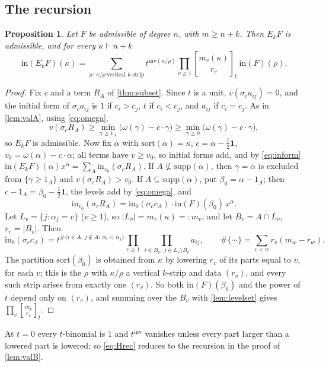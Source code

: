 \documentclass[11pt]{amsart}
\newtheorem{proposition}[theorem]{Proposition}
\theoremstyle{definition}
\theoremstyle{remark}
\numberwithin{equation}{section}
\newcommand{\qbin}[2]{\genfrac{[}{]}{0pt}{}{#1}{#2}_t}
\begin{document}
\subsection{The recursion}
\begin{proposition}\label{prop:Hrec}
Let $F$ be admissible of degree $n$, with $m\ge n+k$. Then $E_kF$ is admissible, and for every $\kappa\vdash n+k$
\begin{equation}\label{eq:Hrec}
\mathrm{in}(E_kF)(\kappa)=\sum_{\rho:\ \kappa/\rho\ \text{vertical $k$-strip}}t^{\mathrm{inv}(\kappa/\rho)}\prod_{v\ge1}\qbin{m_v(\kappa)}{r_v}\ \mathrm{in}(F)(\rho).
\end{equation}
\end{proposition}
\begin{proof}
Fix $c$ and a term $R_A$ of \cref{thm:subset}. Since $t$ is a unit, $v(\sigma_ca_{ij})=0$, and the initial form of $\sigma_ca_{ij}$ is $1$ if $c_i>c_j$, $t$ if $c_i<c_j$, and $a_{ij}$ if $c_i=c_j$. As in \cref{lem:valA}, using \eqref{eq:omega},
\[ v(\sigma_cR_A)\ge\min_{\gamma\ge1_A}\bigl(\omega(\gamma)-c\cdot\gamma\bigr)\ge\min_{\gamma\ge0}\bigl(\omega(\gamma)-c\cdot\gamma\bigr), \]
so $E_kF$ is admissible. Now fix $\alpha$ with $\mathrm{sort}(\alpha)=\kappa$, $c=\alpha-\frac12\mathbf1$, $v_0=\omega(\alpha)-c\cdot\alpha$; all terms have $v\ge v_0$, so initial forms add, and by \eqref{eq:inform} $\mathrm{in}(E_kF)(\alpha)x^\alpha=\sum_A\mathrm{in}_{v_0}(\sigma_cR_A)$. If $A\not\subseteq\mathrm{supp}(\alpha)$, then $\gamma=\alpha$ is excluded from $\{\gamma\ge1_A\}$ and $v(\sigma_cR_A)>v_0$. If $A\subseteq\mathrm{supp}(\alpha)$, put $\beta_0=\alpha-1_A$; then $c-1_A=\beta_0-\frac12\mathbf1$, the levels add by \eqref{eq:omega}, and
\[ \mathrm{in}_{v_0}(\sigma_cR_A)=\mathrm{in}_0(\sigma_cc_A)\cdot\mathrm{in}(F)(\beta_0)\,x^\alpha . \]
Let $L_v=\{j:\alpha_j=v\}$ ($v\ge1$), so $|L_v|=m_v(\kappa)=:m_v$, and let $B_v=A\cap L_v$, $r_v=|B_v|$. Then
\[ \mathrm{in}_0(\sigma_cc_A)=t^{\#\{i\in A,\,j\notin A:\ \alpha_i<\alpha_j\}}\prod_{v\ge1}\ \prod_{i\in B_v,\,j\in L_v\setminus B_v}a_{ij},\qquad \#\{\cdots\}=\sum_{v<w}r_v(m_w-r_w). \]
The partition $\mathrm{sort}(\beta_0)$ is obtained from $\kappa$ by lowering $r_v$ of its parts equal to $v$, for each $v$; this is the $\rho$ with $\kappa/\rho$ a vertical $k$-strip and data $(r_v)$, and every such strip arises from exactly one $(r_v)$. So both $\mathrm{in}(F)(\beta_0)$ and the power of $t$ depend only on $(r_v)$, and summing over the $B_v$ with \cref{lem:levelset} gives $\prod_v\qbin{m_v}{r_v}$.
\end{proof}
At $t=0$ every $t$-binomial is $1$ and $t^{\mathrm{inv}}$ vanishes unless every part larger than a lowered part is lowered; so \eqref{eq:Hrec} reduces to the recursion in the proof of \cref{lem:valB}.
\end{document}
